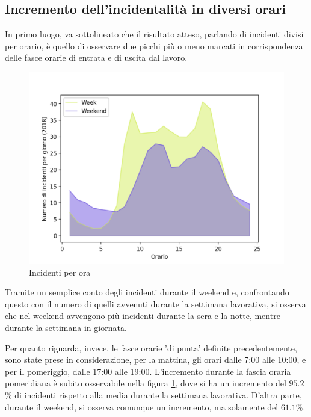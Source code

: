 \documentclass[a4paper]{report}
\begin{document}
\subsection{Incremento dell'incidentalità in diversi orari}

In primo luogo, va sottolineato che il risultato atteso, 
parlando di incidenti divisi per orario, è quello di osservare due picchi più o meno marcati 
in corrispondenza delle fasce orarie di entrata e di uscita dal lavoro.

\begin{figure}
    \includegraphics[width=\linewidth]{../src/incidenti/incidenti_senza_coords/ore_punta/week_weekend.png}
    \caption{Incidenti per ora}
    \label{fig:week-weekend}
\end{figure}

Tramite un semplice conto degli incidenti durante il weekend e, 
confrontando questo con il numero di quelli avvenuti durante la 
settimana lavorativa, si osserva che nel weekend avvengono più incidenti 
durante la sera e la notte, mentre durante la settimana in giornata.

Per quanto riguarda, invece, le fasce orarie 'di punta' definite precedentemente, 
sono state prese in considerazione, per la mattina, gli orari dalle 7:00 alle 10:00, 
e per il pomeriggio, dalle 17:00 alle 19:00.
L'incremento durante la fascia oraria pomeridiana è subito osservabile nella figura 
\ref{fig:week-weekend}, dove si ha un incremento del $95.2$\% di incidenti rispetto 
alla media durante la settimana lavorativa. 
D'altra parte, durante il weekend, si osserva comunque un incremento, ma solamente del $61.1$\%.
\end{document}
